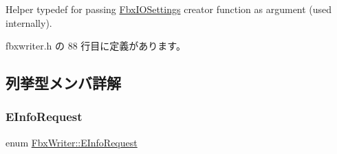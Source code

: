 Helper typedef for passing \hyperlink{class_fbx_i_o_settings}{Fbx\+I\+O\+Settings} creator function as argument (used internally). 



 fbxwriter.\+h の 88 行目に定義があります。



\subsection{列挙型メンバ詳解}
\mbox{\label{class_fbx_writer_a250cda8a59afd8e6be01c89cdd914e2a}} 
\subsubsection{\texorpdfstring{E\+Info\+Request}{EInfoRequest}}
{\footnotesize\ttfamily enum \hyperlink{class_fbx_writer_a250cda8a59afd8e6be01c89cdd914e2a}{Fbx\+Writer\+::\+E\+Info\+Request}}

